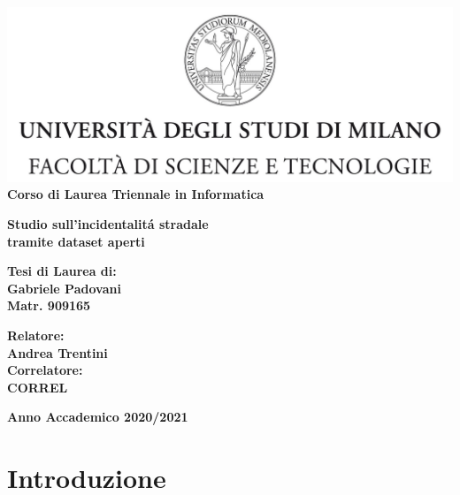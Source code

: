 \documentclass[a4paper]{report}
\begin{document}
\begin{titlepage}
\begin{center}
\includegraphics[width=\textwidth]{Logo.jpg}\\
{\large{\bf Corso di Laurea Triennale in Informatica}}
\end{center}
\vspace{12mm}
\begin{center}
{\huge{\bf Studio sull'incidentalit\'a stradale}}\\
\vspace{4mm}
{\huge{\bf tramite dataset aperti}}\\
\end{center}
\vspace{12mm}
\begin{flushright}
{\large{\bf Tesi di Laurea di:}}\\
{\large{\bf Gabriele Padovani}}\\
{\large{\bf Matr. 909165}}\\
\end{flushright}
\vspace{4mm}
\begin{flushleft}
{\large{\bf Relatore:}}\\
{\large{\bf Andrea Trentini}}\\
\vspace{4mm}
{\large{\bf Correlatore:}}\\
{\large{\bf CORREL}}\\
\end{flushleft}
\vspace{12mm}
\begin{center}
{\large{\bf Anno Accademico 2020/2021}}
\end{center}
\end{titlepage}


\tableofcontents

\chapter{Introduzione}
\end{document}
